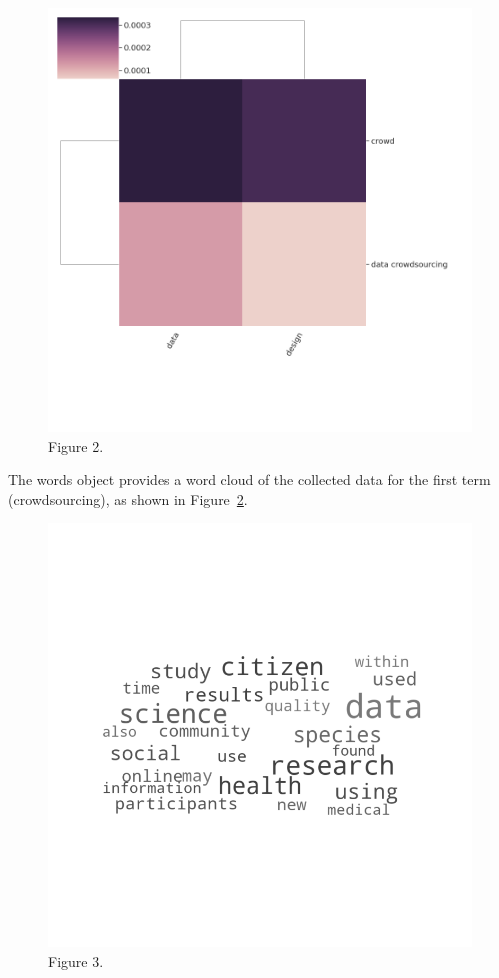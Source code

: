 \documentclass{article}
\begin{document}
\begin{figure}
  \includegraphics[width=\linewidth]{output2.png}
  \caption{Figure 2.}
  \label{fig:2}
\end{figure}



The words object provides a word cloud of the collected data for the first term (crowdsourcing), as shown in Figure~\ref{fig:3}.
\begin{figure}
  \includegraphics[width=\linewidth]{output3.png}
  \caption{Figure 3.}
  \label{fig:3}
\end{figure}
\end{document}
